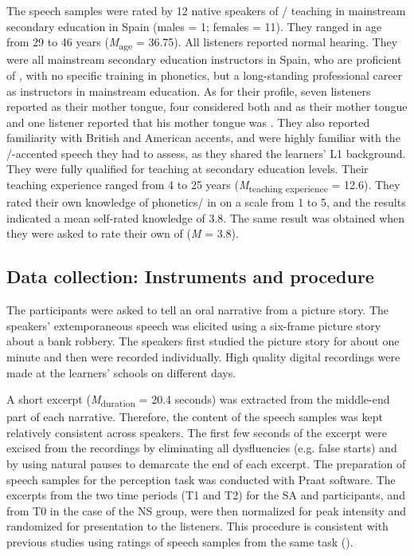 \documentclass[output=paper]{langsci/langscibook}
\begin{document}
The speech samples were rated by 12 native speakers of / teaching  in mainstream secondary education in Spain (males = 1; females = 11). They ranged in age from 29 to 46 years (\textit{M}\textsubscript{age} = 36.75). All listeners reported normal hearing. They were all  mainstream secondary education instructors in Spain, who are proficient  of , with no specific training in phonetics, but a long-standing professional career as  instructors in mainstream education. As for their  profile, seven listeners reported  as their mother tongue, four considered both  and  as their mother tongue and one listener reported that his mother tongue was . They also reported familiarity with British and American accents, and were highly familiar with the /-accented speech they had to assess, as they shared the learners’ {L1} background. They were fully qualified for teaching at secondary education levels. Their  teaching experience ranged from 4 to 25 years (\textit{M}\textsubscript{teaching experience} = 12.6). They rated their own knowledge of phonetics/ in  on a scale from 1 to 5, and the results indicated a mean self-rated knowledge of 3.8. The same result was obtained when they were asked to rate their own  of  (\textit{M} = 3.8).


\subsection{Data collection: Instruments and procedure}
\largerpage

The participants were asked to tell an oral narrative from a picture story. The speakers’ extemporaneous speech was elicited using a six-frame picture story about a bank robbery. The speakers first studied the picture story for about one minute and then were recorded individually. High quality digital recordings were made at the learners’ schools on different days. 

A short excerpt (\textit{M}\textsubscript{duration} = 20.4 seconds) was extracted from the middle-end part of each narrative. Therefore, the content of the speech samples was kept relatively consistent across speakers. The first few seconds of the excerpt were excised from the recordings by eliminating all dysfluencies (e.g. false starts) and by using natural pauses to demarcate the end of each excerpt. The preparation of speech samples for the perception task was conducted with Praat software. The excerpts from the two time periods (T1 and T2) for the SA and  participants, and from T0 in the case of the NS group, were then normalized for peak intensity and randomized for presentation to the listeners. This procedure is consistent with previous studies using ratings of speech samples from the same task (\citealt{Rossiter2009,TrofimovichIsaacs2012,DerwingMunro2013}). 
\end{document}
